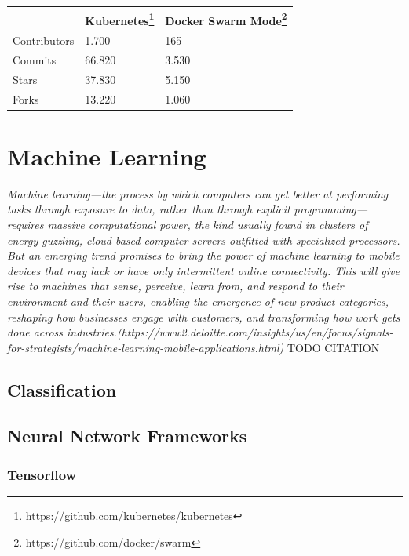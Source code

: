 \begin{longtable}[]{@{}lll@{}}
\toprule
& Kubernetes\footnote{https://github.com/kubernetes/kubernetes} & Docker
Swarm Mode\footnote{https://github.com/docker/swarm}\tabularnewline
\midrule
\endhead
Contributors & 1.700 & 165\tabularnewline
Commits & 66.820 & 3.530\tabularnewline
Stars & 37.830 & 5.150\tabularnewline
Forks & 13.220 & 1.060\tabularnewline
\bottomrule
\end{longtable}

\subsubsection{}\label{section}

\section{Machine Learning}\label{machine-learning}

\emph{Machine learning---the process by which computers can get better
at performing tasks through exposure to data, rather than through
explicit programming---requires massive computational power, the kind
usually found in clusters of energy-guzzling, cloud-based computer
servers outfitted with specialized processors. But an emerging trend
promises to bring the power of machine learning to mobile devices that
may lack or have only intermittent online connectivity. This will give
rise to machines that sense, perceive, learn from, and respond to their
environment and their users, enabling the emergence of new product
categories, reshaping how businesses engage with customers, and
transforming how work gets done across
industries.(https://www2.deloitte.com/insights/us/en/focus/signals-for-strategists/machine-learning-mobile-applications.html)}
TODO CITATION

\subsection{Classification}\label{classification}

\subsection{Neural Network Frameworks}\label{neural-network-frameworks}

\subsubsection{Tensorflow}\label{tensorflow}

